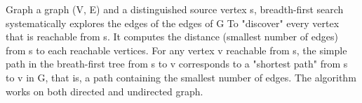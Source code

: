 \documentclass[preview]{standalone}
\begin{document}
\begin{center}
Graph a graph (V, E) and a distinguished source vertex s, breadth-first search systematically explores the edges of the edges of G To "discover" every vertex that is reachable from s. It computes the distance (smallest number of edges) from s to each reachable vertices. For any vertex v reachable from s, the simple path in the breath-first tree from s to v corresponds to a "shortest path" from s to v in G, that is, a path containing the smallest number of edges. The algorithm works on both directed and undirected graph.
\end{center}
\end{document}
